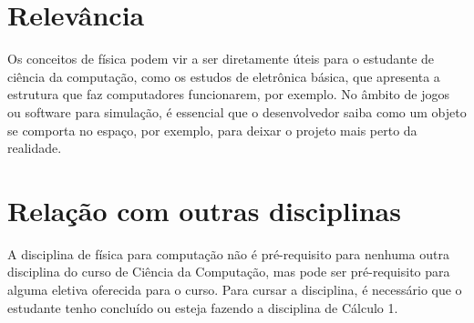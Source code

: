 \documentclass[a4 paper, 10pt]{article}
\begin{document}
\section{Relevância}
Os conceitos de física podem vir a ser diretamente úteis para o estudante de ciência da computação, como os estudos de eletrônica básica, que apresenta a estrutura que faz computadores funcionarem, por exemplo. No âmbito de jogos ou software para simulação, é essencial que o desenvolvedor saiba como um objeto se comporta no espaço, por exemplo, para deixar o projeto mais perto da realidade.

\section{Relação com outras disciplinas}
A disciplina de física para computação não é pré-requisito para nenhuma outra disciplina do curso de Ciência da Computação, mas pode ser pré-requisito para alguma eletiva oferecida para o curso. Para cursar a disciplina, é necessário que o estudante tenho concluído ou esteja fazendo a disciplina de Cálculo 1.


\printbibliography
\end{document}
